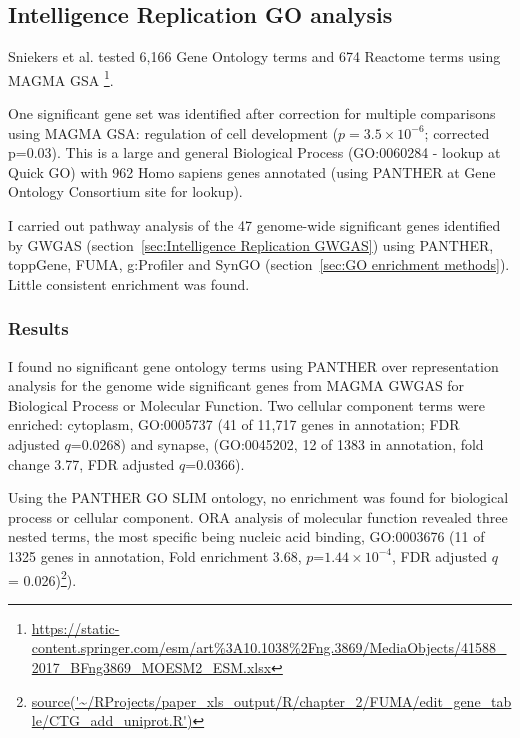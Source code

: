 
\subsection{Intelligence Replication GO analysis}
Sniekers et al. tested 6,166 Gene Ontology terms and 674 Reactome terms using MAGMA GSA
\footnote{\url{https://static-content.springer.com/esm/art\%3A10.1038\%2Fng.3869/MediaObjects/41588_2017_BFng3869_MOESM2_ESM.xlsx}}. 

 One significant gene set was identified after correction for multiple comparisons using MAGMA GSA: regulation of cell development ($p=3.5 \times 10^{-6}$; corrected p=0.03)\cite{sniekers2017genome}. This is a large and general Biological Process (GO:0060284 - lookup at Quick GO)  with 962 Homo sapiens genes annotated (using PANTHER at Gene Ontology Consortium site for lookup).

I carried out pathway analysis of the 47 genome-wide significant genes identified by GWGAS (section~\ref{sec:Intelligence Replication GWGAS}) using PANTHER\cite{mi2013large}, toppGene\cite{chen2009toppgene}, FUMA\cite{watanabe2017functional}, g:Profiler\cite{raudvere2019g} and SynGO\cite{koopmans2019syngo} (section~\ref{sec:GO enrichment methods}). Little consistent enrichment was found. 


\subsubsection{Results}
I found no significant gene ontology terms using PANTHER over representation analysis for the genome wide significant genes from MAGMA GWGAS for Biological Process or Molecular Function. Two cellular component terms were enriched: cytoplasm, GO:0005737 (41 of 11,717 genes in annotation; FDR adjusted $q$=0.0268) and synapse, (GO:0045202, 12 of 1383 in annotation, fold change 3.77, FDR adjusted $q$=0.0366). 

Using the PANTHER GO SLIM ontology, no enrichment was found for biological process or cellular component. ORA analysis of molecular function revealed three nested terms, the most specific being nucleic acid binding, GO:0003676  (11 of 1325 genes in annotation, Fold enrichment 3.68, $p$=$1.44\times10^{-4}$, FDR adjusted $q$ = 0.026)\footnote{\url{source('~/RProjects/paper_xls_output/R/chapter_2/FUMA/edit_gene_table/CTG_add_uniprot.R')}}).

